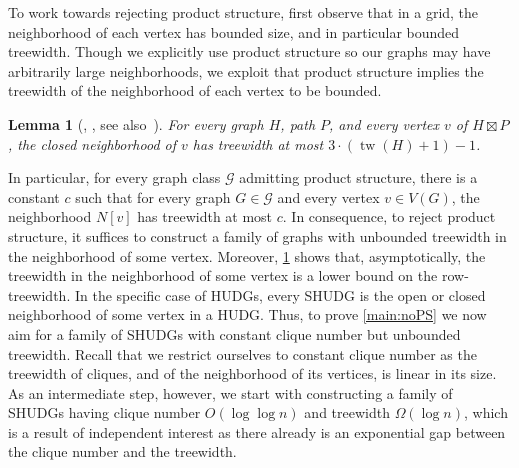 \documentclass[11pt]{article}
\newtheorem{lemma}[theorem]{Lemma}
\DeclareMathOperator{\tw}{tw}
\begin{document}
%
To work towards rejecting product structure, first observe that in a grid, the neighborhood of each vertex has bounded size, and in particular bounded treewidth.
Though we explicitly use product structure so our graphs may have arbitrarily large neighborhoods, we exploit that product structure implies the treewidth of the neighborhood of each vertex to be bounded.
%
\begin{lemma}[{\cite[Lemma 6]{dujmovic_layered_2017}}, {\cite[Lemma 6]{dujmovic_planar_2019}}, see also~\cite{bose_ltw_rtw_2022}]\label{lem:tw_neighborhood}%
\label{lem:PS_neighboorhood}
    For every graph $H$, path $ P $, and every vertex $v$ of $ H \boxtimes P $, the closed neighborhood of $v$ has treewidth at most $ 3 \cdot (\tw(H) + 1) - 1 $.
\end{lemma}
%
In particular, for every graph class $ \mathcal{G} $ admitting product structure, there is a constant $c$ such that for every graph $G \in \mathcal{G}$ and every vertex $v \in V(G)$, the neighborhood $ N[v] $ has treewidth at most $c$.
In consequence, to reject product structure, it suffices to construct a family of graphs with unbounded treewidth in the neighborhood of some vertex.
Moreover, \cref{lem:tw_neighborhood} shows that, asymptotically, the treewidth in the neighborhood of some vertex is a lower bound on the row-treewidth.
In the specific case of HUDGs, every SHUDG is the open or closed neighborhood of some vertex in a HUDG.
Thus, to prove \cref{main:noPS} we now aim for a family of SHUDGs with constant clique number but unbounded treewidth.
%
Recall that we restrict ourselves to constant clique number as the treewidth of cliques, and of the neighborhood of its vertices, is linear in its size.
As an intermediate step, however, we start with constructing a family of SHUDGs having clique number $O(\log \log n)$ and treewidth $\Omega(\log n)$, which is a result of independent interest as there already is an exponential gap between the clique number and the treewidth.
\end{document}
